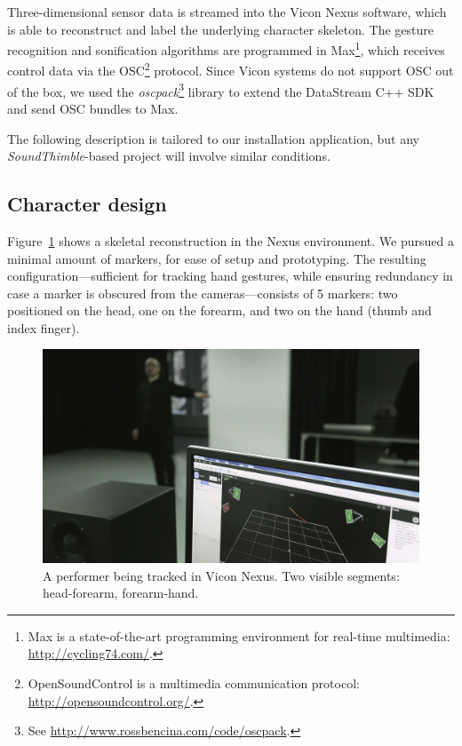 
Three-dimensional sensor data is streamed into the Vicon Nexus software, which is able to reconstruct and label the underlying character skeleton. The gesture recognition and sonification algorithms are programmed in Max\footnote{Max is a state-of-the-art programming environment for real-time multimedia: \url{http://cycling74.com/}.}, which receives control data via the OSC\footnote{OpenSoundControl is a multimedia communication protocol: \url{http://opensoundcontrol.org/}.} protocol. Since Vicon systems do not support OSC out of the box, we used the \textit{oscpack}\footnote{See \url{http://www.rossbencina.com/code/oscpack}.} library to extend the DataStream C++ SDK and send OSC bundles to Max.

The following description is tailored to our installation application, but any \textit{SoundThimble}-based project will involve similar conditions.

\subsection{Character design}

Figure~\ref{fig:nexus} shows a skeletal reconstruction in the Nexus environment. We pursued a minimal amount of markers, for ease of setup and prototyping. The resulting configuration---sufficient for tracking hand gestures, while ensuring redundancy in case a marker is obscured from the cameras---consists of 5 markers: two positioned on the head, one on the forearm, and two on the hand (thumb and index finger).

\begin{figure}[t]
	\centering
	\includegraphics[width=\columnwidth, clip, trim={12cm 0 0 0}]{img/nexus}
	\caption{A performer being tracked in Vicon Nexus. Two visible segments: head-forearm, forearm-hand.}
	\label{fig:nexus}
\end{figure}

